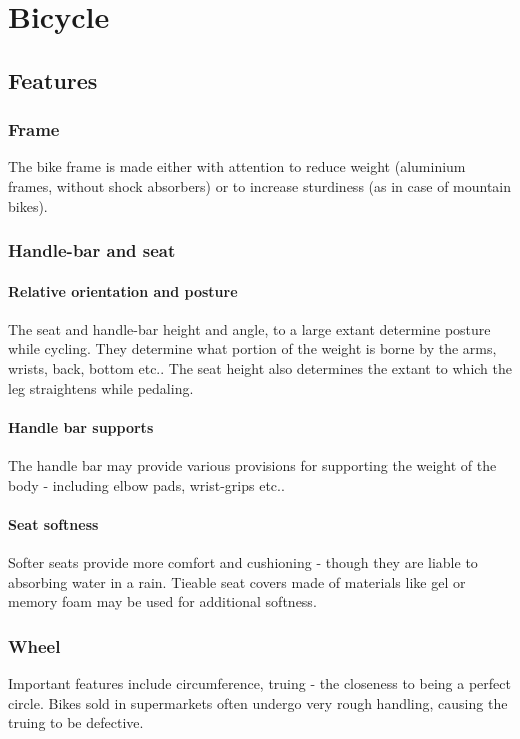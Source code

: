 \documentclass[oneside, article]{memoir}
\begin{document}
\part{Bicycle}
\chapter{Features}
\section{Frame}
The bike frame is made either with attention to reduce weight (aluminium frames, without shock absorbers) or to increase sturdiness (as in case of mountain bikes). 

\section{Handle-bar and seat}
\subsection{Relative orientation and posture}
The seat and handle-bar height and angle, to a large extant determine posture while cycling. They determine what portion of the weight is borne by the arms, wrists, back, bottom etc.. The seat height also determines the extant to which the leg straightens while pedaling.

\subsection{Handle bar supports}
The handle bar may provide various provisions for supporting the weight of the body - including elbow pads, wrist-grips etc..

\subsection{Seat softness}
Softer seats provide more comfort and cushioning - though they are liable to absorbing water in a rain. Tieable seat covers made of materials like gel or memory foam may be used for additional softness.

\section{Wheel}
Important features include circumference, truing - the closeness to being a perfect circle. Bikes sold in supermarkets often undergo very rough handling, causing the truing to be defective.
\end{document}
